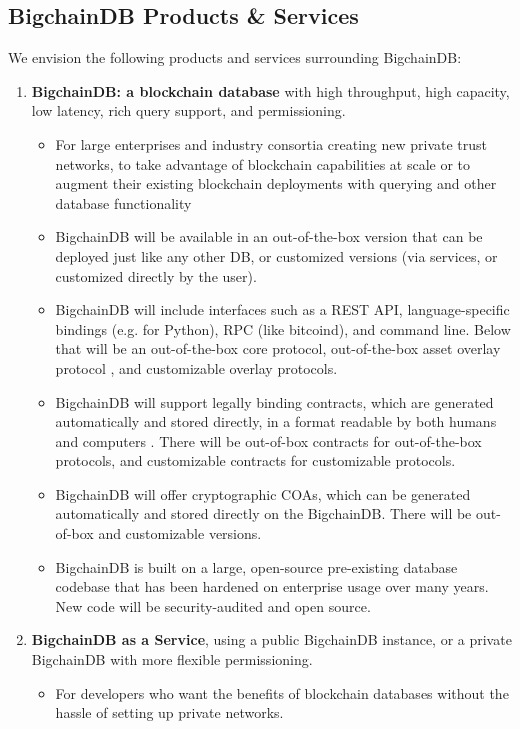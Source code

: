 \subsection{BigchainDB Products \& Services}
We envision the following products and services surrounding BigchainDB:
\begin{enumerate}
 \item \textbf{BigchainDB: a blockchain database} with high throughput, high capacity, low latency, rich query support, and permissioning.
 \begin{itemize}
  \item For large enterprises and industry consortia creating new private trust networks, to take advantage of blockchain capabilities at scale or to augment their existing blockchain deployments with querying and other database functionality
  \item BigchainDB will be available in an out-of-the-box version that can be deployed just like any other DB, or customized versions (via services, or customized directly by the user).
  \item BigchainDB will include interfaces such as a REST API, language-specific bindings (e.g. for Python), RPC (like bitcoind), and command line. Below that will be an out-of-the-box core protocol, out-of-the-box asset overlay protocol \cite{dejonghe_spool}, and customizable overlay protocols.
  \item BigchainDB will support legally binding contracts, which are generated automatically and stored directly, in a format readable by both humans and computers \cite{grigg2004ricardian}. There will be out-of-box contracts for out-of-the-box protocols, and customizable contracts for customizable protocols.
  \item BigchainDB will offer cryptographic COAs, which can be generated automatically and stored directly on the BigchainDB. There will be out-of-box and customizable versions.
  \item BigchainDB is built on a large, open-source pre-existing database codebase that has been hardened on enterprise usage over many years. New code will be security-audited and open source.
 \end{itemize}
 \item \textbf{BigchainDB as a Service}, using a public BigchainDB instance, or a private BigchainDB with more flexible permissioning.
 \begin{itemize}
  \item For developers who want the benefits of blockchain databases without the hassle of setting up private networks.

\end{itemize}
\end{enumerate}
